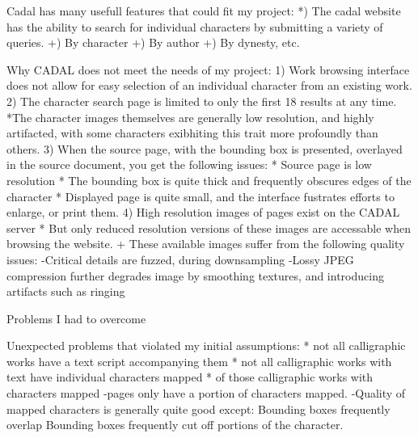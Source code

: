     Cadal has many usefull features that could fit my project:
        *)  The cadal website has the ability to search for individual characters by submitting a variety of queries.
            +)  By character
            +)  By author
            +)  By dynesty, etc.


    Why CADAL does not meet the needs of my project:
        1)  Work browsing interface does not allow for easy selection of an individual character from an existing work.
        2)  The character search page is limited to only the first 18 results at any time.
            *The character images themselves are generally low resolution, and highly artifacted, with some characters exibhiting this trait more profoundly than others.
        3)  When the source page, with the bounding box is presented, overlayed in the source document, you get the following issues:
            *  Source page is low resolution
            *  The bounding box is quite thick and frequently obscures edges of the character
            *  Displayed page is quite small, and the interface fustrates efforts to enlarge, or print them.
        4)  High resolution images of pages exist on the CADAL server
            * But only reduced resolution versions of these images are accessable when browsing the website.
                + These available images suffer from the following quality issues:
                    -Critical details are fuzzed, during downsampling
                    -Lossy JPEG compression further degrades image by smoothing textures, and introducing artifacts such as ringing
                    




    Problems I had to overcome














    Unexpected problems that violated my initial assumptions:
        * not all calligraphic works have a text script accompanying them
        * not all calligraphic works with text have individual characters mapped
        * of those calligraphic works with characters mapped
            -pages only have a portion of characters mapped.
            -Quality of mapped characters is generally quite good except:
                Bounding boxes frequently overlap
                Bounding boxes frequently cut off portions of the character.


